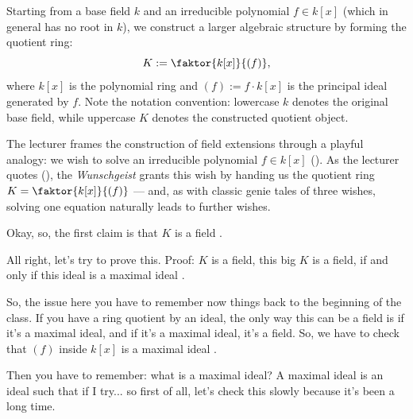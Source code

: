\begin{content}[{Granting Wish 1: The Quotient Ring \texorpdfstring{$K := \faktor{k[x]}{(f)}$}{K := k[x]/(f)}}]
Starting from a base field $k$ and an irreducible polynomial $f \in k[x]$ (which in general has no root in $k$), we construct a larger algebraic structure by forming the quotient ring:
\[
K := \faktor{k[x]}{(f)},
\]
where $k[x]$ is the polynomial ring and $(f) := f \cdot k[x]$ is the principal ideal generated by $f$. Note the notation convention: lowercase $k$ denotes the original base field, while uppercase $K$ denotes the constructed quotient object.
\end{content}

\begin{insight}
The lecturer frames the construction of field extensions through a playful analogy: we wish to solve an irreducible polynomial $f \in k[x]$ (). As the lecturer quotes (), the \emph{Wunschgeist} grants this wish by handing us the quotient ring $K = \faktor{k[x]}{(f)}$ --- and, as with classic genie tales of three wishes, solving one equation naturally leads to further wishes.
\end{insight}

\begin{speech}[01:02:36 - 01:03:42]
Okay, so, the first claim is that $K$ is a field .

All right, let's try to prove this. Proof: $K$ is a field, this big $K$ is a field, if and only if this ideal is a maximal ideal .

So, the issue here you have to remember now things back to the beginning of the class. If you have a ring quotient by an ideal, the only way this can be a field is if it's a maximal ideal, and if it's a maximal ideal, it's a field. So, we have to check that $(f)$ inside $k[x]$ is a maximal ideal .

Then you have to remember: what is a maximal ideal? A maximal ideal is an ideal such that if I try... so first of all, let's check this slowly because it's been a long time.
\end{speech}

\begin{content}
\end{content}


